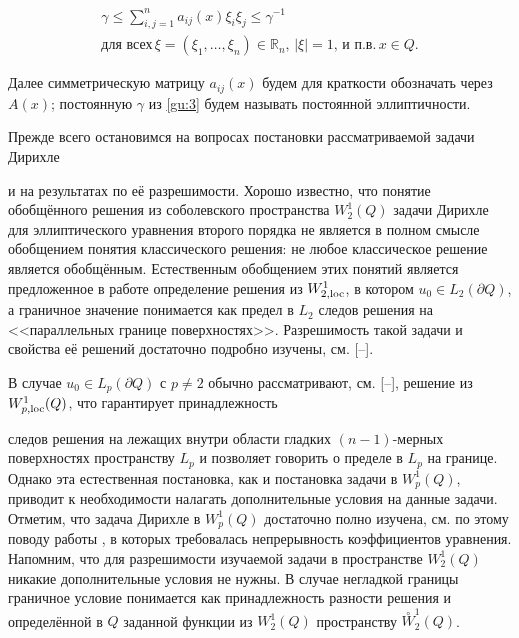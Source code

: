 \begin{equation}

\begin{array}{l}

\gamma \le \sum\limits_{i,j=1}^n a_{ij}(x) \xi _i \xi_j \le \gamma ^{-1}

\\ \text{для всех} \, \xi =(\xi_1, \dots , \xi_n) \in {\mathbb R}_n, \, |\xi | = 1, \, \text{и п.в.} \, x \in Q. 

\end{array}

\label{gu:3}

\end{equation}

Далее симметрическую матрицу ${a_{ij}(x)}$ будем для краткости обозначать через $A(x)$; постоянную $\gamma$ из \eqref{gu:3} будем называть постоянной эллиптичности.




\smallskip




Прежде всего остановимся на вопросах постановки рассматриваемой задачи Дирихле

и на результатах по её разрешимости. Хорошо известно, что понятие обобщённого решения из соболевского пространства $W_2^1(Q)$ задачи Дирихле для эллиптического уравнения второго порядка не является в полном смысле обобщением понятия классического решения: не любое классическое решение является обобщённым. Естественным обобщением этих понятий является предложенное в работе \cite{M76} определение решения из $W_{2, \rm loc}^1$, в котором $u_0 \in L_2(\partial Q)$, а граничное значение понимается как предел в $L_2$ следов решения на <<параллельных границе поверхностях>>. Разрешимость такой задачи и свойства её решений достаточно подробно изучены, см. [--].

В случае $u_0 \in L_p(\partial Q)$ с $p \ne 2$ обычно рассматривают, см. [--], решение из $W_{p, \rm loc}^1(Q)$, что гарантирует принадлежность

следов решения на лежащих внутри области гладких $(n-1)$-мерных поверхностях пространству $L_p$ и позволяет говорить о пределе в $L_p$ на границе. Однако эта естественная постановка, как и постановка задачи в $W^1_p(Q)$, приводит к необходимости налагать дополнительные условия на данные задачи. Отметим, что задача Дирихле в $W^1_p(Q)$ достаточно полно изучена, см. по этому поводу работы \cite{AK, Alx}, в которых требовалась непрерывность коэффициентов уравнения. Напомним, что для разрешимости изучаемой задачи в пространстве $W_2^1(Q)$ никакие дополнительные условия не нужны. В случае негладкой границы граничное условие понимается как принадлежность разности решения и определённой в $Q$ заданной функции из $W_2^1(Q)$ пространству $\stackrel{\circ}{W}_2^1(Q)$.

